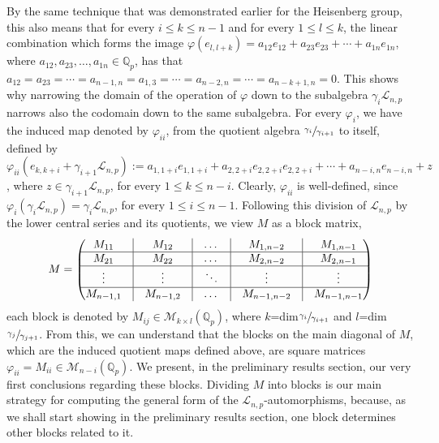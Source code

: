 \documentclass[12pt]{article}
\begin{document}
By the same technique that was demonstrated earlier for the Heisenberg group, this also means that for every $i\leq k\leq n-1$ and for every $1\leq l\leq k$, the linear combination which forms the image $\varphi(e_{l,l+k})=a_{12}e_{12}+a_{23}e_{23}+\cdots+a_{1n}e_{1n}$, where $a_{12},a_{23},\dots,a_{1n}\in\mathbb{Q}_p$, has that $a_{12}=a_{23}=\cdots=a_{n-1,n}=a_{1,3}=\cdots=a_{n-2,n}=\cdots=a_{n-k+1,n}=0$. This shows why narrowing the domain of the operation of $\varphi$ down to the subalgebra $\gamma_i\mathcal{L}_{n,p}$ narrows also the codomain down to the same subalgebra. For every $\varphi_i$, we have the induced map denoted by $\varphi_{ii}$, from the quotient algebra $\sfrac{\gamma_i}{\gamma_{i+1}}$ to itself, defined by $\varphi_{ii}(e_{k,k+i}+\gamma_{i+1}\mathcal{L}_{n,p}):=a_{1,1+i}e_{1,1+i}+a_{2,2+i}e_{2,2+i}e_{2,2+i}+\cdots+a_{n-i,n}e_{n-i,n}+z$, where $z\in\gamma_{i+1}\mathcal{L}_{n,p}$, for every $1\leq k\leq n-i$. Clearly, $\varphi_{ii}$ is well-defined, since $\varphi_i(\gamma_i\mathcal{L}_{n,p})=\gamma_i\mathcal{L}_{n,p}$, for every $1\leq i\leq n-1$.
Following this division of $\mathcal{L}_{n,p}$ by the lower central series and its quotients, we view $M$ as a block matrix, $$M=\begin{pmatrix}
M_{11} & \vline & M_{12}&\vline & \dots& \vline & M_{1,n-2} & \vline&M_{1,n-1}\\
\hline
M_{21} & \vline & M_{22}&\vline & \dots &\vline & M_{2,n-2} &\vline& M_{2,n-1}\\
\hline
\vdots & \vline & \vdots&\vline & \ddots &\vline & \vdots &\vline& \vdots\\
\hline
M_{n-1,1} & \vline & M_{n-1,2}&\vline & \dots &\vline & M_{n-1,n-2} &\vline& M_{n-1,n-1}\\
\end{pmatrix}
$$
each block is denoted by $M_{ij}\in\mathcal{M}_{k\times l}(\mathbb{Q}_p)$, where $k$=dim$\sfrac{\gamma_i}{\gamma_{i+1}}$ and $l$=dim$\sfrac{\gamma_j}{\gamma_{j+1}}$. From this, we can understand that the blocks on the main diagonal of $M$, which are the induced quotient maps defined above, are square matrices $\varphi_{ii}=M_{ii}\in\mathcal{M}_{n-i}(\mathbb{Q}_p)$. We present, in the preliminary results section, our very first conclusions regarding these blocks. Dividing $M$ into blocks is our main strategy for computing the general form of the $\mathcal{L}_{n,p}$-automorphisms, because, as we shall start showing in the preliminary results section, one block determines other blocks related to it.
\end{document}

